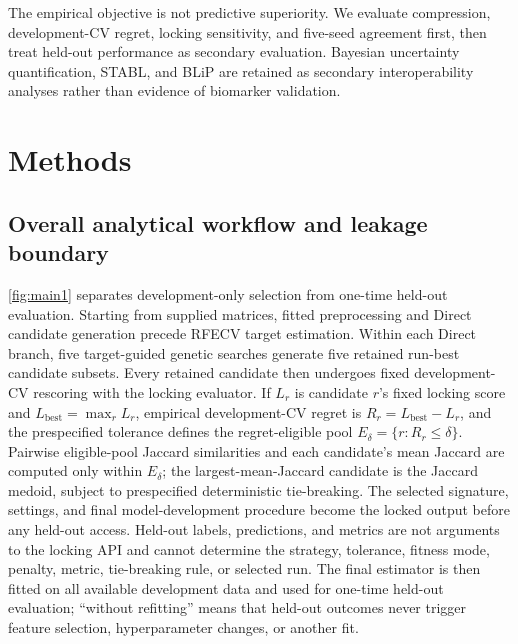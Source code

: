 The empirical objective is not predictive superiority. We evaluate compression, development-CV regret, locking sensitivity, and five-seed agreement first, then treat held-out performance as secondary evaluation. Bayesian uncertainty quantification, STABL, and BLiP are retained as secondary interoperability analyses rather than evidence of biomarker validation.

\FloatBarrier
\section{Methods}

\subsection{Overall analytical workflow and leakage boundary}

\cref{fig:main1} separates development-only selection from one-time held-out evaluation. Starting from supplied matrices, fitted preprocessing and Direct candidate generation precede RFECV target estimation. Within each Direct branch, five target-guided genetic searches generate five retained run-best candidate subsets. Every retained candidate then undergoes fixed development-CV rescoring with the locking evaluator. If \(L_r\) is candidate \(r\)'s fixed locking score and \(L_{\mathrm{best}}=\max_r L_r\), empirical development-CV regret is \(R_r=L_{\mathrm{best}}-L_r\), and the prespecified tolerance defines the regret-eligible pool \(E_\delta=\{r:R_r\leq\delta\}\). Pairwise eligible-pool Jaccard similarities and each candidate's mean Jaccard are computed only within \(E_\delta\); the largest-mean-Jaccard candidate is the Jaccard medoid, subject to prespecified deterministic tie-breaking. The selected signature, settings, and final model-development procedure become the locked output before any held-out access. Held-out labels, predictions, and metrics are not arguments to the locking API and cannot determine the strategy, tolerance, fitness mode, penalty, metric, tie-breaking rule, or selected run. The final estimator is then fitted on all available development data and used for one-time held-out evaluation; ``without refitting'' means that held-out outcomes never trigger feature selection, hyperparameter changes, or another fit.

